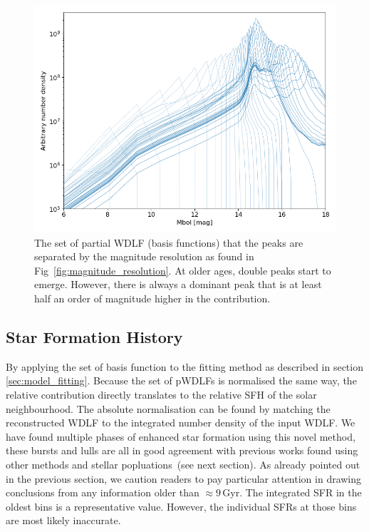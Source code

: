 \documentclass[fleqn,usenatbib]{mnras}
\begin{document}
\begin{figure}
    \includegraphics[width=\columnwidth]{figures/fig_04_basis_pwdlf.png}
    \caption{The set of partial WDLF (basis functions) that the peaks are
    separated by the magnitude resolution as found in
    Fig~\ref{fig:magnitude_resolution}. At older ages, double peaks start to
    emerge. However, there is always a dominant peak that is at least half an
    order of magnitude higher in the contribution.}
    \label{fig:basis_pwdlf}
\end{figure}

\subsection{Star Formation History}

By applying the set of basis function to the fitting method as described in
section \textsection\ref{sec:model_fitting}. Because the set of pWDLFs is
normalised the same way, the relative contribution directly translates to the
relative SFH of the solar neighbourhood. The absolute normalisation can be
found by matching the reconstructed WDLF to the integrated number density of
the input WDLF. We have found multiple phases of enhanced star formation using
this novel method, these bursts and lulls are all in good agreement with
previous works found using other methods and stellar popluations~(see next
section). As already pointed out in the previous section, we caution readers to
pay particular attention in drawing conclusions from any information older than
$\approx9$\,Gyr. The integrated SFR in the oldest bins is a representative
value. However, the individual SFRs at those bins are most likely inaccurate.
\end{document}
